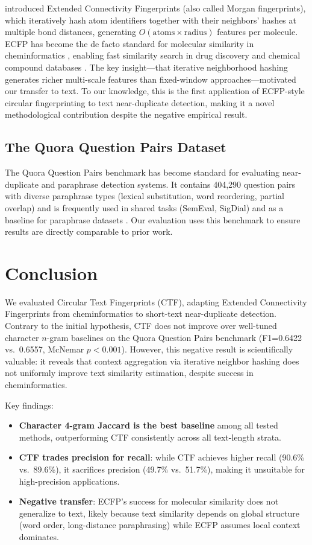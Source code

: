 \documentclass[11pt,letterpaper]{article}
\begin{document}
\citet{Rogers2010} introduced Extended Connectivity Fingerprints (also called Morgan fingerprints), which iteratively hash atom identifiers together with their neighbors' hashes at multiple bond distances, generating $O(\text{atoms} \times \text{radius})$ features per molecule. ECFP has become the de facto standard for molecular similarity in cheminformatics \citep{Hahn2013, Maggiora2014}, enabling fast similarity search in drug discovery and chemical compound databases \citep{Hahn2013}. The key insight---that iterative neighborhood hashing generates richer multi-scale features than fixed-window approaches---motivated our transfer to text. To our knowledge, this is the first application of ECFP-style circular fingerprinting to text near-duplicate detection, making it a novel methodological contribution despite the negative empirical result.

\subsection{The Quora Question Pairs Dataset}

The Quora Question Pairs benchmark \citep{Iyer2017} has become standard for evaluating near-duplicate and paraphrase detection systems. It contains 404,290 question pairs with diverse paraphrase types (lexical substitution, word reordering, partial overlap) and is frequently used in shared tasks (SemEval, SigDial) and as a baseline for paraphrase datasets \citep{Iyer2017}. Our evaluation uses this benchmark to ensure results are directly comparable to prior work.

\section{Conclusion}

We evaluated Circular Text Fingerprints (CTF), adapting Extended Connectivity Fingerprints from cheminformatics to short-text near-duplicate detection. Contrary to the initial hypothesis, CTF does not improve over well-tuned character $n$-gram baselines on the Quora Question Pairs benchmark (F1=0.6422 vs.\ 0.6557, McNemar $p{<}0.001$). However, this negative result is scientifically valuable: it reveals that context aggregation via iterative neighbor hashing does not uniformly improve text similarity estimation, despite success in cheminformatics.

Key findings:
\begin{itemize}
  \item \textbf{Character 4-gram Jaccard is the best baseline} among all tested methods, outperforming CTF consistently across all text-length strata.
  \item \textbf{CTF trades precision for recall}: while CTF achieves higher recall (90.6\% vs.\ 89.6\%), it sacrifices precision (49.7\% vs.\ 51.7\%), making it unsuitable for high-precision applications.
  \item \textbf{Negative transfer}: ECFP's success for molecular similarity does not generalize to text, likely because text similarity depends on global structure (word order, long-distance paraphrasing) while ECFP assumes local context dominates.
\end{itemize}
\end{document}
